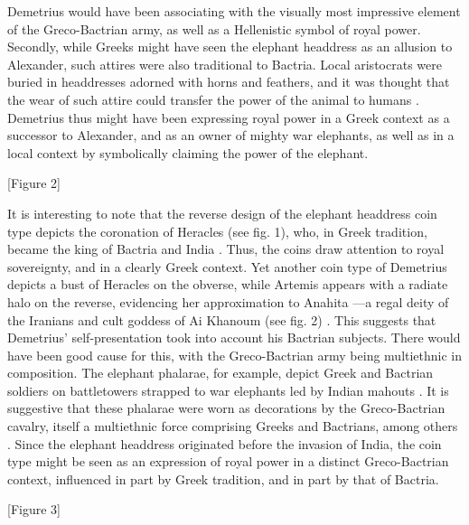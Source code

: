 \documentclass{ijsra}
\begin{document}
Demetrius would have been associating with the visually most impressive element of the Greco-Bactrian army,
as well as a Hellenistic symbol of royal power.
Secondly, while Greeks might have seen the elephant headdress as an allusion to Alexander, such attires were also traditional to Bactria.
Local aristocrats were buried in headdresses adorned with horns and feathers,
and it was thought that the wear of such attire could transfer the power of the animal to humans \parencite[215--226]{Lerner2009}.
Demetrius thus might have been expressing royal power in a Greek context as a successor to Alexander,
and as an owner of mighty war elephants, as well as in a local context by symbolically claiming the power of the elephant.

[Figure 2]

It is interesting to note that the reverse design of the elephant headdress coin type depicts the coronation of Heracles (see fig. 1),%
who, in Greek tradition, became the king of Bactria and India \parencites[70--80]{Bukharin2004}[140]{Stanco2012}. %
Thus, the coins draw attention to royal sovereignty, and in a clearly Greek context.
Yet another coin type of Demetrius depicts a bust of Heracles on the obverse, while Artemis appears with a radiate halo on the reverse,
evidencing her approximation to Anahita —a regal deity of the Iranians and cult goddess of Ai Khanoum (see fig. 2) %
\parencite[242]{MacDowall2007b}.
This suggests that Demetrius’ self-presentation took into account his Bactrian subjects.
There would have been good cause for this, with the Greco-Bactrian army being multiethnic in composition.
The elephant phalarae, for example, depict Greek and Bactrian soldiers on battletowers strapped to war elephants led by Indian mahouts
\parencites[10]{Pfrommer1993}[588]{Treister1999}.
It is suggestive that these phalarae were worn as decorations by the Greco-Bactrian cavalry, itself a multiethnic force comprising
Greeks and Bactrians, among others \parencite[50--51]{Lerner1999}.
Since the elephant headdress originated before the invasion of India, the coin type might be seen as an expression of royal power
in a distinct Greco-Bactrian context, influenced in part by Greek tradition, and in part by that of Bactria.

[Figure 3]
\end{document}
